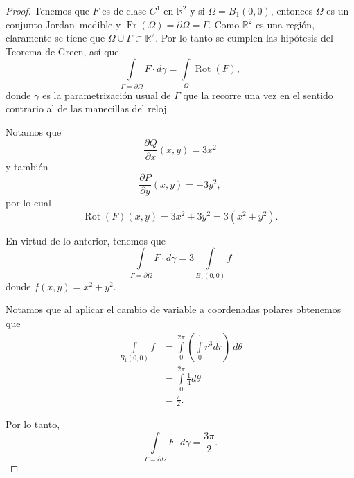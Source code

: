\documentclass[
]{krantz}
\theoremstyle{definition}
\theoremstyle{definition}
\theoremstyle{definition}
\theoremstyle{definition}
\theoremstyle{remark}
\begin{document}
\begin{proof}
\iffalse{} {Proof. } \fi{}Tenemos que \(F\) es de clase \(C^1\) en \(\mathbb{R}^2\) y si \(\Omega = B_1(0,0)\), entonces \(\Omega\) es un conjunto Jordan--medible y \(\mathop{\mathrm{Fr}}\left(\Omega\right) = \partial \Omega = \Gamma\). Como \(\mathbb{R}^2\) es una región, claramente se tiene que \(\Omega \cup \Gamma\subset \mathbb{R}^2\). Por lo tanto se cumplen las hipótesis del Teorema de Green, así que
\begin{equation*}
            \displaystyle\int\limits_{\Gamma=\partial \Omega} F \cdot d\gamma = \int\limits_{\Omega} \mathop{\mathrm{Rot}}\left( F \right), 
\end{equation*}
donde \(\gamma\) es la parametrización usual de \(\Gamma\) que la recorre una vez en el sentido contrario al de las manecillas del reloj.

Notamos que
\begin{equation*}
            \frac{\partial Q}{\partial x}(x,y) = 3x^2
\end{equation*}
y también
\begin{equation*}
            \frac{\partial P}{\partial y}(x,y) = -3y^2,
\end{equation*}
por lo cual
\begin{equation*}
            \mathop{\mathrm{Rot}}(F)(x,y) = 3x^2 + 3y^2 = 3(x^2 + y^2). 
\end{equation*}

En virtud de lo anterior, tenemos que
\begin{equation*}
            \displaystyle\int\limits_{\Gamma=\partial \Omega} F \cdot d\gamma = 3\int\limits_{B_1(0,0)} f
        \end{equation*}
donde \(f(x,y) = x^2+y^2\).

Notamos que al aplicar el cambio de variable a coordenadas polares obtenemos que
\begin{align*}
            \int\limits_{B_1(0,0)} f & = \int\limits_{0}^{2\pi}\left(\int\limits_{0}^{1} r^3 dr\right)\ d\theta \\
            & = \int\limits_{0}^{2\pi} \frac{1}{4} d\theta \\
            & = \frac{\pi}{2}.
        \end{align*}

Por lo tanto,
\begin{equation*}
            \displaystyle\int\limits_{\Gamma=\partial \Omega} F \cdot d\gamma = \frac{3\pi}{2}.
        \end{equation*}
\end{proof}
\end{document}
